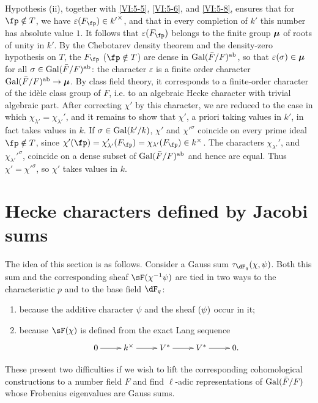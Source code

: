 Hypothesis (ii), together with \ref{VI:5-5}, \ref{VI:5-6}, and \ref{VI:5-8}, ensures that 
for $\fp\notin T$, we have $\varepsilon(F_\fp)\in {k'}^\times$, and that in every 
completion of $k'$ this number has absolute value $1$. It follows that 
$\varepsilon(F_\fp)$ belongs to the finite group ${\bm\mu}$ of roots of unity 
in $k'$. By the Chebotarev density theorem and the density-zero hypothesis 
on $T$, the $F_\fp$ ($\fp\notin T$) are dense in 
  $\operatorname{Gal}(\bar F/F)^\text{ab}$, so that $\varepsilon(\sigma)\in {\bm\mu}$ for all 
$\sigma\in \operatorname{Gal}(\bar F/F)^\text{ab}$: the character $\varepsilon$ is a 
  finite order character $\operatorname{Gal}(\bar F/F)^\text{ab}\to {\bm\mu}$. By 
class field theory, it corresponds to a finite-order character 
of the idèle class group of $F$, i.e. to an algebraic Hecke character 
with trivial algebraic part. After correcting $\chi'$ by this 
character, we are reduced to the case in which 
$\chi_{\lambda'}=\chi_{\lambda'}'$, and it remains to show that $\chi'$, 
a priori taking values in $k'$, in fact takes values in $k$. If 
$\sigma\in \operatorname{Gal}(k'/k)$, $\chi'$ and ${\chi'}^\sigma$ coincide on every prime 
ideal $\fp\notin T$, since 
$\chi'(\fp) = \chi'_{\lambda'}(F_\fp) = \chi_{\lambda'}(F_\fp) \in k^\times$. 
The characters $\chi_{\lambda'}'$, and ${\chi_{\lambda'}'}^\sigma$, coincide 
on a dense subset of $\operatorname{Gal}(\bar F/F)^\text{ab}$ and hence are equal. Thus 
$\chi'={\chi'}^\sigma$, so $\chi'$ takes values in $k$. 










\section{Hecke characters defined by Jacobi sums}\label{VI:6}

The idea of this section is as follows. Consider a Gauss sum 
$\tau_{\dF_q}(\chi,\psi)$. Both this sum and the corresponding sheaf 
$\sF(\chi^{-1}\psi)$ are tied in two ways to the characteristic $p$ and to the 
base field $\dF_q$: 
\begin{enumerate}[\indent a)]
  \item because the additive character $\psi$ and the sheaf 
    $\sf(\psi)$ occur in it; 
  \item because $\sF(\chi)$ is defined from the exact Lang sequence 
    \[\xymatrix{
      0 \ar[r] 
        & k^\times \ar[r] 
        & V^\ast \ar[r] 
        & V^\ast \ar[r] 
        & 0 \text{.} 
    }\]
\end{enumerate}
These present two difficulties if we wish to lift the corresponding 
cohomological constructions to a number field $F$ and find 
$\ell$-adic representations of $\operatorname{Gal}(\bar F/F)$ whose Frobenius eigenvalues 
are Gauss sums. 


